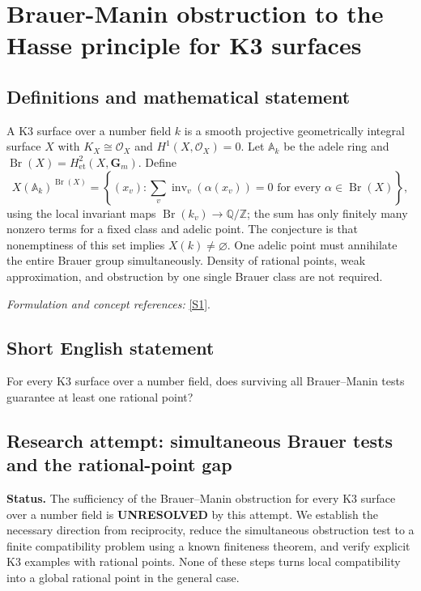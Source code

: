 \documentclass[11pt]{article}
\begin{document}
\section*{\texorpdfstring{Brauer-Manin obstruction to the Hasse principle for K3 surfaces}{Brauer-Manin obstruction to the Hasse principle for K3 surfaces}}\label{383}
\subsection{Definitions and mathematical statement}
A K3 surface over a number field $k$ is a smooth projective geometrically integral surface $X$ with $K_X\cong\mathcal O_X$ and $H^1(X,\mathcal O_X)=0$. Let ${\mathbb{A}}_k$ be the adele ring and $\operatorname{Br}(X)=H^2_{\mathrm{et}}(X,\mathbf G_m)$. Define
\[
 X({\mathbb{A}}_k)^{\operatorname{Br}(X)}=
 \left\{(x_v):\sum_v\operatorname{inv}_v(\alpha(x_v))=0
 \text{ for every }\alpha\in\operatorname{Br}(X)\right\},
\]
using the local invariant maps $\operatorname{Br}(k_v)\to{\mathbb{Q}}/{\mathbb{Z}}$; the sum has only finitely many nonzero terms for a fixed class and adelic point. The conjecture is that nonemptiness of this set implies $X(k)\ne\varnothing$. One adelic point must annihilate the entire Brauer group simultaneously. Density of rational points, weak approximation, and obstruction by one single Brauer class are not required.
\par\smallskip\textit{Formulation and concept references:} \href{https://arxiv.org/html/2502.08723v1}{[S1]}.

\subsection{Short English statement}
For every K3 surface over a number field, does surviving all Brauer--Manin tests guarantee at least one rational point?
\subsection{Research attempt: simultaneous Brauer tests and the rational-point gap}
\textbf{Status.} The sufficiency of the Brauer--Manin obstruction for every K3 surface over a number field is \textbf{UNRESOLVED} by this attempt. We establish the necessary direction from reciprocity, reduce the simultaneous obstruction test to a finite compatibility problem using a known finiteness theorem, and verify explicit K3 examples with rational points. None of these steps turns local compatibility into a global rational point in the general case.
\end{document}
